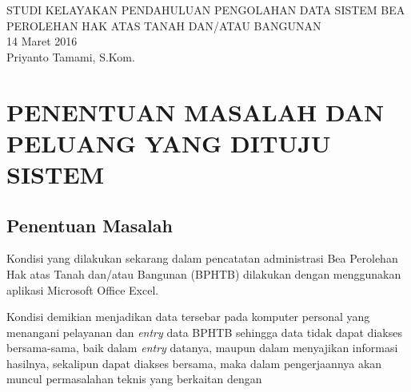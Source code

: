 \documentclass[pdftex,12pt, oneside]{article}
\begin{document}

%
\begin{center}
{\large STUDI KELAYAKAN PENDAHULUAN PENGOLAHAN DATA SISTEM BEA PEROLEHAN HAK ATAS TANAH DAN/ATAU BANGUNAN}
\\[1cm]
14 Maret 2016\\
Priyanto Tamami, S.Kom.
\end{center}


%
%

% 


%
%
%
%

%
%
%
% 
% 
% 

%
%


\section{PENENTUAN MASALAH DAN PELUANG YANG DITUJU SISTEM}

\subsection{Penentuan Masalah}

Kondisi yang dilakukan sekarang dalam pencatatan administrasi Bea Perolehan Hak atas Tanah dan/atau Bangunan (BPHTB) dilakukan dengan menggunakan aplikasi Microsoft Office Excel.

Kondisi demikian menjadikan data tersebar pada komputer personal yang menangani pelayanan dan \textit{entry} data BPHTB sehingga data tidak dapat diakses bersama-sama, baik dalam \textit{entry} datanya, maupun dalam menyajikan informasi hasilnya, sekalipun dapat diakses bersama, maka dalam pengerjaannya akan muncul permasalahan teknis yang berkaitan dengan 
\end{document}
